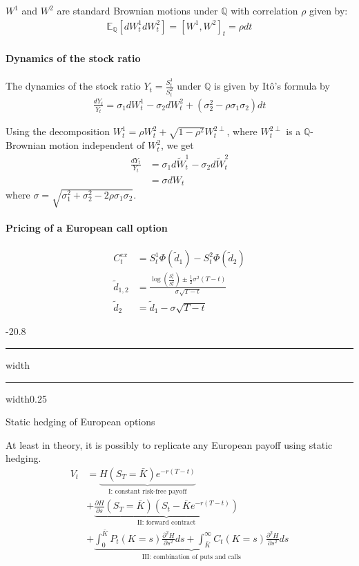 \documentclass[a4paper,landscape,7pt,fleqn]{scrartcl}
\makeatletter
\renewcommand{\subsection}{\@startsection{subsection}{1}{0mm}%
{-2\baselineskip}{0.8\baselineskip}%
{\hrule depth 0.2pt width\columnwidth\hrule depth0.75pt
width0.25\columnwidth\vspace*{1.2em}\large\bfseries}}
\makeatother
\begin{document}
\begin{multicols*}{3}
$W^1$ and $W^2$ are standard Brownian motions under $\mathbb{Q}$ with correlation $\rho$ given by:
\begin{align*}
\mathbb{E}_\mathbb{Q} [dW_t^1 dW_t^2] =[W^1,W^2]_t = \rho dt
\end{align*}

\paragraph{Dynamics of the stock ratio}
The dynamics of the stock ratio $Y_t = \frac{S_t^1}{S_t^2}$ under $\mathbb{Q}$ is given by Itô's formula by
\begin{align*}
\frac{dY_t}{Y_t} = \sigma_1 dW_t^1 - \sigma_2 dW_t^2 + (\sigma_2^2 - \rho \sigma_1 \sigma_2) dt
\end{align*}

Using the decomposition $W_t^1 = \rho W_t^2 + \sqrt{1-\rho^2} W_t^{2 \perp}$, where $W_t^{2 \perp}$ is a $\mathbb{Q}$-Brownian motion independent of $W_t^2$, we get
\begin{align*}
\frac{dY_t}{Y_t} &= \sigma_1 d \tilde W_t^1 - \sigma_2 d \tilde W_t^2 \\
&= \sigma dW_t
\end{align*}
where $\sigma = \sqrt{\sigma_1^2 + \sigma_2^2 - 2 \rho \sigma_1 \sigma_2}$.

\paragraph{Pricing of a European call option}
\begin{align*}
C_t^{ex} &= S_t^1\Phi(\tilde d_1) - S_t^2 \Phi(\tilde d_2) \\
\tilde d_{1,2} &= \frac{\log \left( \frac{S_t^1}{S_t^2} \right) \pm \frac{1}{2} \sigma^2 (T-t)}{\sigma \sqrt{T-t}} \\
\tilde d_2 &= \tilde d_1 - \sigma \sqrt{T-t}
\end{align*}

\subsection{Static hedging of European options}

At least in theory, it is possibly to replicate any European payoff using static hedging.
\begin{align*}
V_t &= \underbrace{ H(S_T = \bar K) e^{-r (T-t)} }\limits_\text{I: constant risk-free payoff} \\
&+ \underbrace{ \frac{\partial H}{\partial s}(S_T = \bar K) \left( S_t - \bar K e^{-r (T-t)} \right) }\limits_\text{II: forward contract} \\
& + \underbrace{ \int_0^{\bar K} P_t(K=s) \frac{\partial^2 H}{\partial s^2} ds + \int_{\bar K}^\infty C_t (K=s) \frac{\partial^2 H}{\partial s^2} ds }\limits_\text{III: combination of puts and calls}
\end{align*}


\end{multicols*}
\end{document}
